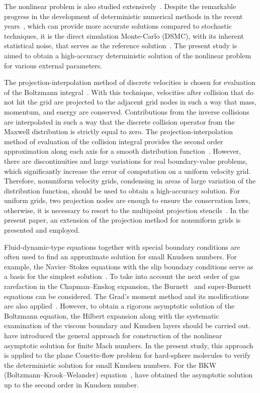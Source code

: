 \documentclass[]{elsarticle} %
\begin{document}
The nonlinear problem is also studied extensively~\citep{Garzo2003}.
Despite the remarkable progress in the development of deterministic numerical methods
in the recent years~\citep[see e.g.][]{Dimarco2014,Mieussens2014},
which can provide more accurate solutions compared to stochastic techniques,
it is the direct simulation Monte-Carlo (DSMC), with its inherent statistical noise,
that serves as the reference solution~\citep[see e.g.][]{Cercignani1994,Struchtrup2009,Agrawal2014}.
The present study is aimed to obtain a high-accuracy deterministic solution
of the nonlinear problem for various external parameters.

The projection-interpolation method of discrete velocities is chosen for
evaluation of the Boltzmann integral~\citep{Tcheremissine1998, Tcheremissine2006}.
With this technique, velocities after collision that do not hit the grid
are projected to the adjacent grid nodes in such a way that mass, momentum, and energy are conserved.
Contributions from the inverse collisions are interpolated in such a way that
the discrete collision operator from the Maxwell distribution is strictly equal to zero.
The projection-interpolation method of evaluation of the collision integral
provides the second order approximation along each axis for a smooth distribution function~\citep{Anikin2012}.
However, there are discontinuities and large variations for real boundary-value problems,
which significantly increase the error of computation on a uniform velocity grid.
Therefore, nonuniform velocity grids, condensing in areas of large variation
of the distribution function, should be used to obtain a high-accuracy solution.
For uniform grids, two projection nodes are enough to ensure the conservation laws,
otherwise, it is necessary to resort to the multipoint projection stencils~\citep{Dodulad2012}.
In the present paper, an extension of the projection method for nonuniform grids is presented and employed.

Fluid-dynamic-type equations together with special boundary conditions
are often used to find an approximate solution for small Knudsen numbers.
For example, the Navier--Stokes equations with the slip boundary conditions
serve as a basis for the simplest solution~\citep{Sharipov2000}.
To take into account the next order of gas rarefaction in the Chapman--Enskog expansion,
the Burnett~\citep{Reese2003} and super-Burnett~\citep{Agrawal2014} equations can be considered.
The Grad's moment method and its modifications are also applied~\citep{Struchtrup2009}.
However, to obtain a rigorous asymptotic solution of the Boltzmann equation,
the Hilbert expansion along with the systematic examination of the viscous boundary and Knudsen layers
should be carried out. \citet{Sone2000} have introduced the general approach
for construction of the nonlinear asymptotic solution for finite Mach numbers.
In the present study, this approach is applied to the plane Couette-flow problem for hard-sphere molecules
to verify the deterministic solution for small Knudsen numbers.
For the BKW (Boltzmann--Krook--Welander) equation~\citep{Krook1954,Welander1954},
\citet{Sone1970} have obtained the asymptotic solution up to the second order in Knudsen number.
\end{document}

